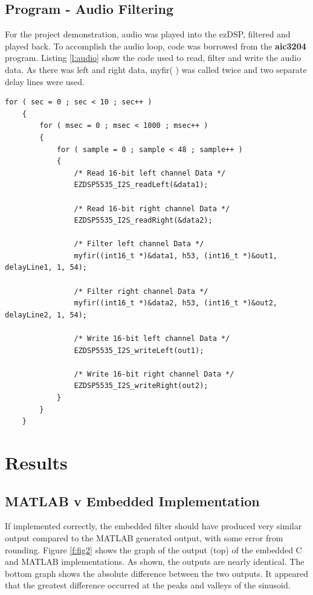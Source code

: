 \documentclass[11pt,pdftex,portrait,letterpaper]{article}
\begin{document}
\subsection{Program - Audio Filtering}

For the project demonstration, audio was played into the ezDSP, filtered and played back. To accomplish the audio loop, code was borrowed from the \textbf{aic3204} program. Listing \ref{l:audio} show the code used to read, filter and write the audio data. As there was left and right data, myfir( ) was called twice and two separate delay lines were used. 

\begin{lstlisting}[caption={Snippet of code to read, filter and write data}, label=l:audio]
    for ( sec = 0 ; sec < 10 ; sec++ )
    {
        for ( msec = 0 ; msec < 1000 ; msec++ )
        {
            for ( sample = 0 ; sample < 48 ; sample++ )
            {
                /* Read 16-bit left channel Data */
                EZDSP5535_I2S_readLeft(&data1);
                
                /* Read 16-bit right channel Data */
                EZDSP5535_I2S_readRight(&data2);
                
                /* Filter left channel Data */
                myfir((int16_t *)&data1, h53, (int16_t *)&out1, delayLine1, 1, 54);

                /* Filter right channel Data */
                myfir((int16_t *)&data2, h53, (int16_t *)&out2, delayLine2, 1, 54);

                /* Write 16-bit left channel Data */
                EZDSP5535_I2S_writeLeft(out1);
                
                /* Write 16-bit right channel Data */
                EZDSP5535_I2S_writeRight(out2);
            }
        }
    }
\end{lstlisting}

\section{Results}

\subsection{MATLAB v Embedded Implementation}

If implemented correctly, the embedded filter should have produced very similar output compared to the MATLAB generated output, with some error from rounding. Figure \ref{f:fig2} shows the graph of the output (top) of the embedded C and MATLAB implementations. As shown, the outputs are nearly identical. The bottom graph shows the absolute difference between the two outputs. It appeared that the greatest difference occurred at the peaks and valleys of the sinusoid. 
\end{document}

